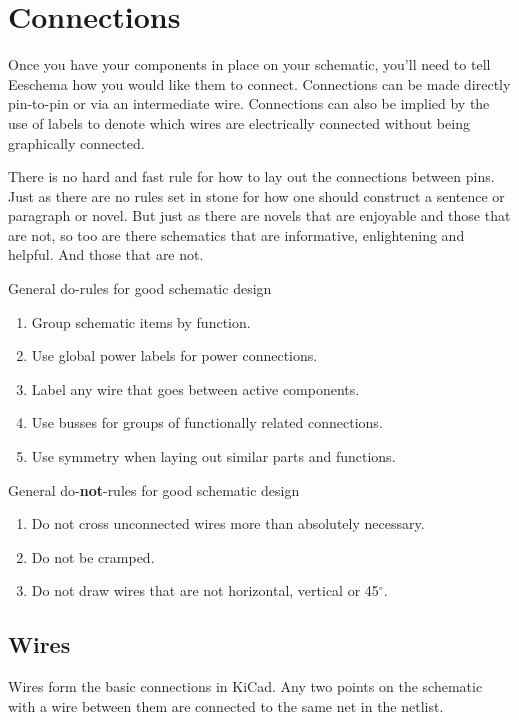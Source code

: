 \section{Connections}

Once you have your components in place on your schematic, you'll need to tell Eeschema how you would like them to connect.
Connections can be made directly pin-to-pin or via an intermediate wire.
Connections can also be implied by the use of labels to denote which wires are electrically connected without being graphically connected.

There is no hard and fast rule for how to lay out the connections between pins.
Just as there are no rules set in stone for how one should construct a sentence or paragraph or novel.
But just as there are novels that are enjoyable and those that are not, so too are there schematics that are informative, enlightening and helpful.
And those that are not.

General do-rules for good schematic design
\begin{enumerate}
\item Group schematic items by function.
\item Use global power labels for power connections.
\item Label any wire that goes between active components.
\item Use busses for groups of functionally related connections.
\item Use symmetry when laying out similar parts and functions.
\end{enumerate}

General do-\textbf{not}-rules for good schematic design
\begin{enumerate}
\item Do not cross unconnected wires more than absolutely necessary.
\item Do not be cramped.
\item Do not draw wires that are not horizontal, vertical or 45$^{\circ}$. 
\end{enumerate}

\subsection{Wires}

Wires form the basic connections in KiCad.
Any two points on the schematic with a wire between them are connected to the same net in the netlist.

